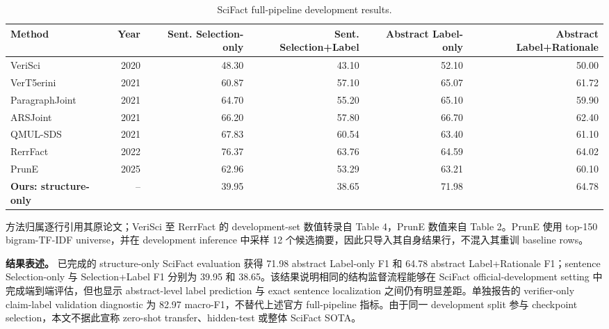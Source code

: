 \documentclass[letterpaper]{article}
\begin{document}
\begin{table}[t]
\centering
\small
\setlength{\tabcolsep}{3.5pt}
\renewcommand{\arraystretch}{1.08}
\caption{SciFact full-pipeline development results.}
\label{tab:scifact-results}
\begin{tabularx}{\textwidth}{@{}Y r r r r r@{}}
\toprule
\textbf{Method} & \textbf{Year} & \textbf{Sent. Selection-only} & \textbf{Sent. Selection+Label} & \textbf{Abstract Label-only} & \textbf{Abstract Label+Rationale} \\
\midrule
VeriSci \citep{Wadden2020SciFact} & 2020 & 48.30 & 43.10 & 52.10 & 50.00 \\
VerT5erini \citep{Pradeep2021VerT5erini} & 2021 & 60.87 & 57.10 & 65.07 & 61.72 \\
ParagraphJoint \citep{Li2021ParagraphJoint} & 2021 & 64.70 & 55.20 & 65.10 & 59.90 \\
ARSJoint \citep{Zhang2021ARSJoint} & 2021 & 66.20 & 57.80 & 66.70 & 62.40 \\
QMUL-SDS \citep{Zeng2021QMULSDS} & 2021 & 67.83 & 60.54 & 63.40 & 61.10 \\
RerrFact \citep{Rana2022RerrFact} & 2022 & 76.37 & 63.76 & 64.59 & 64.02 \\
PrunE \citep{Fang2025PrunE} & 2025 & 62.96 & 53.29 & 63.21 & 60.10 \\
\textbf{Ours: structure-only} & -- & 39.95 & 38.65 & 71.98 & 64.78 \\
\bottomrule
\end{tabularx}
\end{table}

方法归属逐行引用其原论文；VeriSci 至 RerrFact 的 development-set 数值转录自 \citet{Rana2022RerrFact} Table 4，PrunE 数值来自 \citet{Fang2025PrunE} Table 2。PrunE 使用 top-150 bigram-TF-IDF universe，并在 development inference 中采样 12 个候选摘要，因此只导入其自身结果行，不混入其重训 baseline rows。

\textbf{结果表述。} 已完成的 structure-only SciFact evaluation 获得 71.98 abstract Label-only F1 和 64.78 abstract Label+Rationale F1；sentence Selection-only 与 Selection+Label F1 分别为 39.95 和 38.65。该结果说明相同的结构监督流程能够在 SciFact official-development setting 中完成端到端评估，但也显示 abstract-level label prediction 与 exact sentence localization 之间仍有明显差距。单独报告的 verifier-only claim-label validation diagnostic 为 82.97 macro-F1，不替代上述官方 full-pipeline 指标。由于同一 development split 参与 checkpoint selection，本文不据此宣称 zero-shot transfer、hidden-test 或整体 SciFact SOTA。
\end{document}
